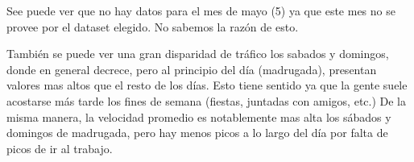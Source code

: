 See puede ver que no hay datos para el mes de mayo (5) ya que este mes 
no se provee por el dataset elegido. No sabemos la raz\'on de esto. 

Tambi\'en se puede ver una gran disparidad de tr\'afico los sabados y domingos, 
donde en general decrece, pero al principio del d\'ia (madrugada), presentan 
valores mas altos que el resto de los d\'ias. Esto tiene sentido ya que la 
gente suele acostarse m\'as tarde los fines de semana (fiestas, juntadas con 
amigos, etc.) 
De la misma manera, la velocidad promedio es notablemente mas alta los s\'abados 
y domingos de madrugada, pero hay menos picos a lo largo del d\'ia por falta de 
picos de ir al trabajo. 



